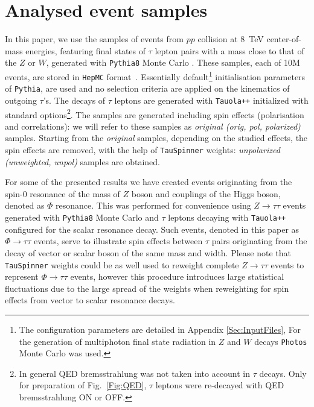 \documentclass{article}
\begin{document}


\section{Analysed event samples} \label{Sec:samples}

In this paper, we use the samples of events from $pp$ collision at 8~TeV center-of-mass energies, featuring
final states of $\tau$ lepton pairs with a mass close to that of the $Z$ or $W$, generated with 
{\tt Pythia8} Monte Carlo \cite{Sjostrand:2007gs}. These samples, each 
of 10M events, are  stored in   {\tt HepMC} format~\cite{Dobbs:2001ck}. 
Essentially default\footnote{%
The configuration parameters are detailed in Appendix \ref{Sec:InputFiles},
For the generation of 
multiphoton final state radiation in $Z$ and $W$ decays {\tt Photos} 
Monte Carlo \cite{Davidson:2010ew} was used.
}
%
initialisation parameters of {\tt Pythia}, are used
and no selection criteria are applied on the kinematics of outgoing $\tau$'s.
The decays of $\tau$ leptons are generated with {\tt Tauola++} initialized
with  standard options\footnote{In general QED bremsstrahlung was not taken into
account in  $\tau$ decays. Only for preparation of Fig.~\ref{Fig:QED},  $\tau$ leptons were 
re-decayed with  QED bremsstrahlung ON or OFF.}. 
The samples are generated including spin effects (polarisation and correlations): we will refer to these samples as {\it original (orig, pol, polarized)} samples.
Starting from the  {\it original} samples, depending on the studied effects, the spin effects are 
removed, with the help of {\tt TauSpinner} weights: {\it unpolarized (unweighted, unpol)} samples are obtained.  %

For some of the presented results we have created events originating from the spin-0 resonance 
of the mass of $Z$ boson and couplings of the Higgs boson, denoted as $\Phi$ resonance. 
This was performed for convenience using $Z \to \tau \tau$ events generated with 
{\tt Pythia8} Monte Carlo and $\tau$ leptons decaying with {\tt Tauola++}
configured for the scalar resonance decay. 
Such events, denoted in this paper as $\Phi \to \tau \tau$ events,  
serve to illustrate spin effects between $\tau$ pairs originating  from the decay of vector or scalar boson of the same mass and width.
Please note that {\tt TauSpinner} weights could be as well used to reweight complete $Z \to \tau \tau$ events 
to represent  $\Phi \to \tau \tau$ events,
however this procedure introduces large statistical fluctuations due to the large spread of the weights
when reweighting for spin effects from vector to scalar resonance decays. 
\end{document}
